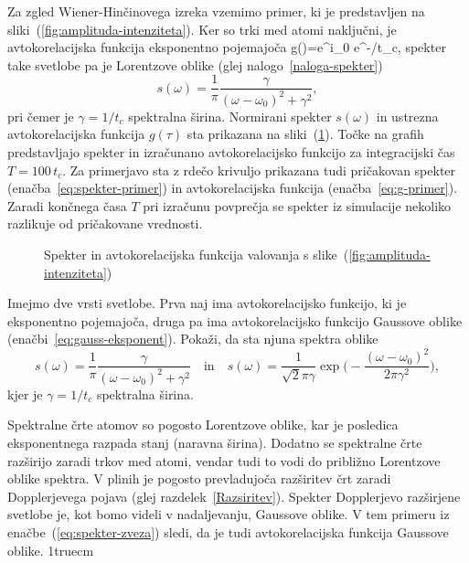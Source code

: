 Za zgled Wiener-Hinčinovega izreka vzemimo primer, ki je predstavljen na 
sliki~(\ref{fig:amplituda-intenziteta}). 
Ker so trki med atomi naključni, je avtokorelacijska funkcija eksponentno pojemajoča
\beq
g(\tau)=e^{i\omega_{0}\tau} e^{-\tau/t_{c}},
\label{eq:g-primer}
\eeq
spekter take svetlobe pa je Lorentzove oblike (glej nalogo~\ref{naloga-spekter})
\begin{equation}
s(\omega)=\frac{1}{\pi}\frac{\gamma}{(\omega-\omega_{0})^{2}+\gamma^{2}},
\label{eq:spekter-primer}
\end{equation}
pri čemer je $\gamma=1/t_{c}$ spektralna širina. 
Normirani spekter $s(\omega)$ in ustrezna avtokorelacijska funkcija $g(\tau)$ 
sta prikazana na sliki~(\ref{fig:SpekterAc}). 
Točke na grafih 
predstavljajo spekter in izračunano avtokorelacijsko funkcijo 
za integracijski čas $T=100\,t_{c}$. Za primerjavo sta z rdečo 
krivuljo prikazana tudi pričakovan spekter (enačba~\ref{eq:spekter-primer}) in avtokorelacijska
funkcija (enačba~\ref{eq:g-primer}). Zaradi končnega
časa $T$ pri izračunu povprečja se spekter iz simulacije nekoliko razlikuje
od pričakovane vrednosti. 
\begin{figure}[h]
\centering
\def\svgwidth{65truemm} 
\qquad
\def\svgwidth{65truemm} 

\caption{Spekter in avtokorelacijska funkcija valovanja s slike~(\ref{fig:amplituda-intenziteta})}
\label{fig:SpekterAc}
\end{figure}

\begin{definition}
\label{naloga-spekter}
Imejmo dve vrsti svetlobe. Prva naj ima avtokorelacijsko funkcijo, ki je eksponentno pojemajoča, druga
pa ima avtokorelacijsko funkcijo Gaussove oblike (enačbi~\ref{eq:gauss-eksponent}). Pokaži, da sta njuna
spektra oblike
\begin{equation}
s(\omega)=
\frac{1}{\pi}\frac{\gamma}{(\omega-\omega_{0})^{2}+\gamma^{2}} \quad \mathrm{in} \quad 
s(\omega)= \frac{1}{\sqrt{2}\pi\gamma}\exp\big(-
\frac{\left(\omega-\omega_{0}\right)^{2}}{2\pi\gamma^{2}}\big),
\end{equation}
kjer je $\gamma=1/t_{c}$ spektralna širina. 
\end{definition}

Spektralne črte atomov so pogosto Lorentzove oblike, kar je posledica
eksponentnega razpada stanj (naravna širina). Dodatno se spektralne
črte razširijo zaradi trkov med atomi, vendar tudi to vodi do približno Lorentzove
oblike spektra. V plinih je pogosto prevladujoča razširitev črt
zaradi Dopplerjevega pojava (glej razdelek~\ref{Razsiritev}). 
Spekter Dopplerjevo razširjene svetlobe je, kot bomo videli v 
nadaljevanju, Gaussove oblike. V tem primeru iz enačbe~(\ref{eq:spekter-zveza})
sledi, da je tudi avtokorelacijska funkcija Gaussove oblike.
\vglue1truecm


